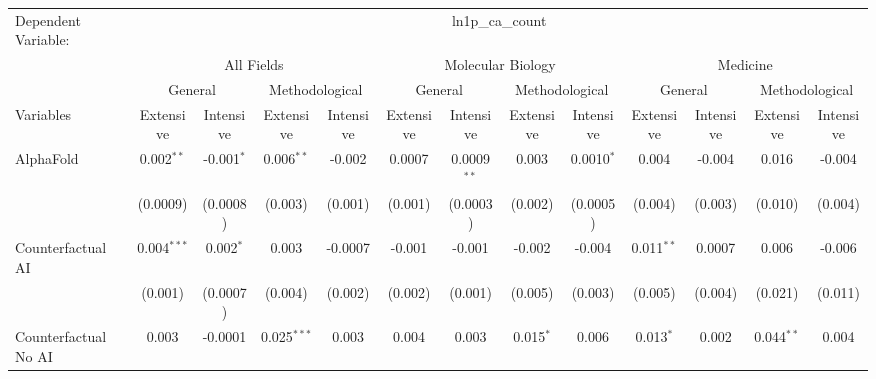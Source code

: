 \begingroup
\centering
\begin{tabular}{lcccccccccccc}
   \tabularnewline \midrule \midrule
   Dependent Variable: & \multicolumn{12}{c}{ln1p\_ca\_count}\\
 & \multicolumn{4}{c}{All Fields} & \multicolumn{4}{c}{Molecular Biology} & \multicolumn{4}{c}{Medicine} \\
\cmidrule(lr){2-5} \cmidrule(lr){6-9} \cmidrule(lr){10-13}
 & \multicolumn{2}{c}{General} & \multicolumn{2}{c}{Methodological} & \multicolumn{2}{c}{General} & \multicolumn{2}{c}{Methodological} & \multicolumn{2}{c}{General} & \multicolumn{2}{c}{Methodological} \\
\cmidrule(lr){2-3} \cmidrule(lr){4-5} \cmidrule(lr){6-7} \cmidrule(lr){8-9} \cmidrule(lr){10-11} \cmidrule(lr){12-13}
Variables & \multicolumn{1}{c}{Extensive} & \multicolumn{1}{c}{Intensive} & \multicolumn{1}{c}{Extensive} & \multicolumn{1}{c}{Intensive} & \multicolumn{1}{c}{Extensive} & \multicolumn{1}{c}{Intensive} & \multicolumn{1}{c}{Extensive} & \multicolumn{1}{c}{Intensive} & \multicolumn{1}{c}{Extensive} & \multicolumn{1}{c}{Intensive} & \multicolumn{1}{c}{Extensive} & \multicolumn{1}{c}{Intensive} \\
\cmidrule(lr){1-1}\cmidrule(lr){2-2} \cmidrule(lr){3-3} \cmidrule(lr){4-4} \cmidrule(lr){5-5} \cmidrule(lr){6-6} \cmidrule(lr){7-7} \cmidrule(lr){8-8} \cmidrule(lr){9-9} \cmidrule(lr){10-10} \cmidrule(lr){11-11} \cmidrule(lr){12-12} \cmidrule(lr){13-13}
   AlphaFold                                & 0.002$^{**}$  & -0.001$^{*}$ & 0.006$^{**}$   & -0.002         & 0.0007  & 0.0009$^{**}$ & 0.003         & 0.0010$^{*}$ & 0.004        & -0.004   & 0.016         & -0.004\\   
                                            & (0.0009)      & (0.0008)     & (0.003)        & (0.001)        & (0.001) & (0.0003)      & (0.002)       & (0.0005)     & (0.004)      & (0.003)  & (0.010)       & (0.004)\\   
   Counterfactual AI                        & 0.004$^{***}$ & 0.002$^{*}$  & 0.003          & -0.0007        & -0.001  & -0.001        & -0.002        & -0.004       & 0.011$^{**}$ & 0.0007   & 0.006         & -0.006\\   
                                            & (0.001)       & (0.0007)     & (0.004)        & (0.002)        & (0.002) & (0.001)       & (0.005)       & (0.003)      & (0.005)      & (0.004)  & (0.021)       & (0.011)\\   
   Counterfactual No AI                     & 0.003         & -0.0001      & 0.025$^{***}$  & 0.003          & 0.004   & 0.003         & 0.015$^{*}$   & 0.006        & 0.013$^{*}$  & 0.002    & 0.044$^{**}$  & 0.004\\   

\end{tabular}
